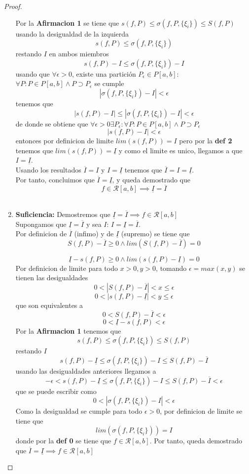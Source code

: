 \documentclass{article}
\begin{document}
\begin{proof}
\begin{enumerate}
Por la \textbf{Afirmacion 1} se tiene que \(s(f, P) \leq \sigma(f, P,\{\xi_i\}) \leq S(f, P)\) usando la desigualdad de la izquierda
\[
s(f, P) \leq \sigma(f, P,\{\xi_i\})
\]
restando \(I\) en ambos miembros
\[
s(f, P) - I \leq \sigma(f, P,\{\xi_i\}) - I
\]
usando que \( \forall \epsilon > 0 \), existe una partición \( P_\epsilon \in P[a, b]\): \(\forall P: P \in P[a, b] \wedge P \supset P_\epsilon\) se cumple
    \[
    |\sigma(f, P,\{\xi_i\}) - I| < \epsilon
    \]
tenemos que
    \[
|s(f, P) - I| \leq |\sigma(f, P,\{\xi_i\}) - I| < \epsilon
    \]
de donde se obtiene que  \(\forall \epsilon > 0 \exists P_\epsilon: \forall P: P \in P[a, b] \wedge P \supset P_\epsilon\)
    \[
|s(f, P) - I| < \epsilon
    \]
entonces por definicion de limite \(lim(s(f, P)) = I\) pero por la \textbf{def 2} tenemos que \(lim(s(f, P)) = \underline{I}\) y como el limite es unico, llegamos a que \(I = \underline{I}\).\\

Usando los resultados \(\overline{I} = I\) y \(I = \underline{I}\) tenemos que \(\overline{I} = I = \underline{I}\).\\

Por tanto, concluimos que \(\overline{I} = \underline{I}\), y queda demostrado que 
\[f \in \mathcal{R}[a, b] \implies \underline{I} = \overline{I} \] \\

\item \textbf{Suficiencia:} Demostremos que \(\underline{I} = \overline{I} \implies f \in \mathcal{R}[a, b]\)\\

Supongamos que  \(\underline{I} = \overline{I}\) y sea \(I\): \(I = \underline{I} = \overline{I}\).\\

Por definicion de \(\overline{I}\) (infimo) y de \(\underline{I}\) (supremo) se tiene que 
\[
S(f, P) - \overline{I} \geq 0 \wedge lim (S(f, P) - \overline{I}) = 0
\]

\[
\underline{I} - s(f, P) \geq 0 \wedge lim (s(f, P) - \underline{I}) = 0
\]
Por definicion de limite para todo \(x > 0, y > 0\), tomando \(\epsilon = max(x, y)\) se tienen las desigualdades 
\[
0< |S(f, P) - \overline{I} | < x \leq \epsilon
\]
\[
0< |s(f, P) - \underline{I} | < y \leq \epsilon 
\]
que son equivalentes a
\[
0< S(f, P) - \overline{I}  < \epsilon
\]
\[
0<  \underline{I} -  s(f, P)  < \epsilon
\]
Por la \textbf{Afirmacion 1} tenemos que 
\[
s(f, P) \leq \sigma(f, P,\{\xi_i\}) \leq S(f, P)
\]
restando \(I\)
\[
s(f, P) -\underline{I} \leq \sigma(f, P,\{\xi_i\}) - I \leq S(f, P) - \overline{I}
\]
usando las desigualdades anteriores llegamos a 
\[
-\epsilon < s(f, P) -\underline{I} \leq \sigma(f, P,\{\xi_i\}) - I \leq S(f, P) - \overline{I} < \epsilon
\]
que se puede escribir como
\[
0 <|\sigma(f, P,\{\xi_i\}) - I |< \epsilon
\]
Como la desigualdad se cumple para todo \(\epsilon > 0\), por definicion de limite se tiene que 
\[
lim(\sigma(f, P,\{\xi_i\})) = I
\]
donde por la \textbf{def 0} se tiene que \(f \in \mathcal{R}[a, b]\). Por tanto, queda demostrado que \( \overline{I} = \underline{I} \implies f \in \mathcal{R}[a, b] \)



\end{enumerate}
\end{proof}
\end{document}
